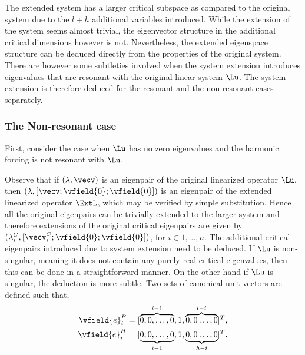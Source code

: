 The extended system has a larger critical subspace as compared to the original system due to the $l+h$ additional variables introduced. While the extension of the system seems almost trivial, the eigenvector structure in the additional critical dimensions however is not. Nevertheless, the extended eigenspace structure can be deduced directly from the properties of the original system. There are however some subtleties involved when the system extension introduces eigenvalues that are resonant with the original linear system $\Lu$. The system extension is therefore deduced for the resonant and the non-resonant cases separately. 

\subsubsection{The Non-resonant case}

First, consider the case when $\Lu$ has no zero eigenvalues and the harmonic forcing is not resonant with $\Lu$. 

Observe that if $(\lambda, \vecv)$ is an eigenpair of the original linearized operator $\Lu$, then $(\lambda, [\vecv; \vfield{0}; \vfield{0}])$ is an eigenpair of the extended linearized operator $\ExtL$, which may be verified by simple substitution. Hence all the original eigenpairs can be trivially extended to the larger system and therefore extensions of the original critical eigenpairs are given by $(\lambda^{C}_{i}, [\vecv^{C}_{i}; \vfield{0}; \vfield{0}])$, for $i \in 1,\ldots,n$. The additional critical eigenpairs introduced due to system extension need to be deduced. If $\Lu$ is non-singular, meaning it does not contain any purely real critical eigenvalues, then this can be done in a straightforward manner. On the other hand if $\Lu$ is singular, the deduction is more subtle. Two sets of canonical unit vectors are defined such that,
\begin{subequations}
	\begin{align}
		\label{eqn:zeta_i_l}
		\vfield{e}^{P}_{i} = [\overbrace{0,0,\ldots,0}^{i-1},1,\overbrace{0,0\ldots,0}^{l-i}]^{T}, \\
		\vfield{e}^{H}_{i} = [\underbrace{0,0,\ldots,0}_{i-1},1,\underbrace{0,0\ldots,0}_{h-i}]^{T}.
	\end{align}
\end{subequations}

